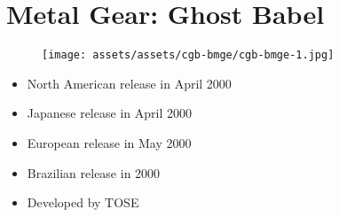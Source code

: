 \documentclass{book}
\begin{document}
\begingroup \chapter*{Metal Gear: Ghost Babel} \endgroup
\begin{figure}[H]
\vskip 4pt
\centering
\texttt{[image: assets/assets/cgb-bmge/cgb-bmge-1.jpg]}\end{figure}
\begin{itemize} [nosep]




\item North American release in April 2000







\item Japanese release in April 2000







\item European release in May 2000







\item Brazilian release in 2000












\item Developed by TOSE

\end{itemize}\noindent
\end{document}
